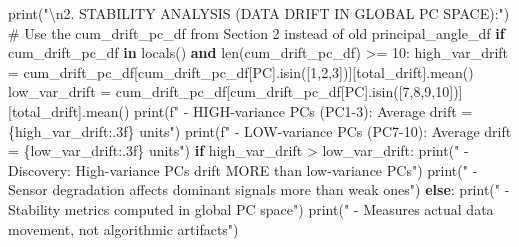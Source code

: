 \documentclass[
  letterpaper,
  DIV=11,
  numbers=noendperiod]{scrartcl}
\newenvironment{Shaded}{\begin{snugshade}}{\end{snugshade}}
\newcommand{\BuiltInTok}[1]{\textcolor[rgb]{0.00,0.23,0.31}{#1}}
\newcommand{\CharTok}[1]{\textcolor[rgb]{0.13,0.47,0.30}{#1}}
\newcommand{\CommentTok}[1]{\textcolor[rgb]{0.37,0.37,0.37}{#1}}
\newcommand{\ControlFlowTok}[1]{\textcolor[rgb]{0.00,0.23,0.31}{\textbf{#1}}}
\newcommand{\DecValTok}[1]{\textcolor[rgb]{0.68,0.00,0.00}{#1}}
\newcommand{\KeywordTok}[1]{\textcolor[rgb]{0.00,0.23,0.31}{\textbf{#1}}}
\newcommand{\NormalTok}[1]{\textcolor[rgb]{0.00,0.23,0.31}{#1}}
\newcommand{\OperatorTok}[1]{\textcolor[rgb]{0.37,0.37,0.37}{#1}}
\newcommand{\SpecialCharTok}[1]{\textcolor[rgb]{0.37,0.37,0.37}{#1}}
\newcommand{\SpecialStringTok}[1]{\textcolor[rgb]{0.13,0.47,0.30}{#1}}
\newcommand{\StringTok}[1]{\textcolor[rgb]{0.13,0.47,0.30}{#1}}
\renewenvironment{Shaded}{%
  \begin{tcolorbox}[%
    enhanced,%
    colback=codebg,%
    colframe=codebg,%
    borderline west={3pt}{0pt}{sectionblue},%
    fontupper=\small\ttfamily,%
    boxrule=0pt,%
    arc=0pt,%
    boxsep=5pt,%
    left=2mm,%
    right=2mm,%
    top=2mm,%
    bottom=2mm%
  ]%
}{%
  \end{tcolorbox}%
}
\begin{document}
\begin{Shaded}
\begin{Highlighting}[]
\BuiltInTok{print}\NormalTok{(}\StringTok{"}\CharTok{\textbackslash{}n}\StringTok{2. STABILITY ANALYSIS (DATA DRIFT IN GLOBAL PC SPACE):"}\NormalTok{)}
\CommentTok{\# Use the cum\_drift\_pc\_df from Section 2 instead of old principal\_angle\_df}
\ControlFlowTok{if} \StringTok{\textquotesingle{}cum\_drift\_pc\_df\textquotesingle{}} \KeywordTok{in} \BuiltInTok{locals}\NormalTok{() }\KeywordTok{and} \BuiltInTok{len}\NormalTok{(cum\_drift\_pc\_df) }\OperatorTok{\textgreater{}=} \DecValTok{10}\NormalTok{:}
\NormalTok{    high\_var\_drift }\OperatorTok{=}\NormalTok{ cum\_drift\_pc\_df[cum\_drift\_pc\_df[}\StringTok{\textquotesingle{}PC\textquotesingle{}}\NormalTok{].isin([}\DecValTok{1}\NormalTok{,}\DecValTok{2}\NormalTok{,}\DecValTok{3}\NormalTok{])][}\StringTok{\textquotesingle{}total\_drift\textquotesingle{}}\NormalTok{].mean()}
\NormalTok{    low\_var\_drift }\OperatorTok{=}\NormalTok{ cum\_drift\_pc\_df[cum\_drift\_pc\_df[}\StringTok{\textquotesingle{}PC\textquotesingle{}}\NormalTok{].isin([}\DecValTok{7}\NormalTok{,}\DecValTok{8}\NormalTok{,}\DecValTok{9}\NormalTok{,}\DecValTok{10}\NormalTok{])][}\StringTok{\textquotesingle{}total\_drift\textquotesingle{}}\NormalTok{].mean()}
    \BuiltInTok{print}\NormalTok{(}\SpecialStringTok{f"   {-} HIGH{-}variance PCs (PC1{-}3): Average drift = }\SpecialCharTok{\{}\NormalTok{high\_var\_drift}\SpecialCharTok{:.3f\}}\SpecialStringTok{ units"}\NormalTok{)}
    \BuiltInTok{print}\NormalTok{(}\SpecialStringTok{f"   {-} LOW{-}variance PCs (PC7{-}10): Average drift = }\SpecialCharTok{\{}\NormalTok{low\_var\_drift}\SpecialCharTok{:.3f\}}\SpecialStringTok{ units"}\NormalTok{)}
    \ControlFlowTok{if}\NormalTok{ high\_var\_drift }\OperatorTok{\textgreater{}}\NormalTok{ low\_var\_drift:}
        \BuiltInTok{print}\NormalTok{(}\StringTok{"   {-} Discovery: High{-}variance PCs drift MORE than low{-}variance PCs"}\NormalTok{)}
        \BuiltInTok{print}\NormalTok{(}\StringTok{"   {-} Sensor degradation affects dominant signals more than weak ones"}\NormalTok{)}
\ControlFlowTok{else}\NormalTok{:}
    \BuiltInTok{print}\NormalTok{(}\StringTok{"   {-} Stability metrics computed in global PC space"}\NormalTok{)}
    \BuiltInTok{print}\NormalTok{(}\StringTok{"   {-} Measures actual data movement, not algorithmic artifacts"}\NormalTok{)}


\end{Highlighting}
\end{Shaded}
\end{document}
